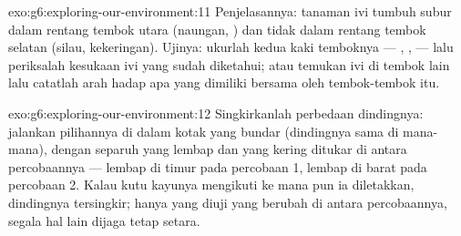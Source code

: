 \begin{solution}{exo:g6:exploring-our-environment:11}
Penjelasannya: tanaman ivi tumbuh subur dalam rentang  tembok
utara (naungan, ) dan tidak dalam rentang tembok selatan
(silau, kekeringan). Ujinya: ukurlah kedua kaki temboknya --- ,
,  --- lalu periksalah kesukaan ivi yang sudah
diketahui; atau temukan ivi di tembok lain lalu catatlah arah hadap
apa yang dimiliki bersama oleh tembok-tembok itu.
\end{solution}

\begin{solution}{exo:g6:exploring-our-environment:12}
Singkirkanlah perbedaan dindingnya: jalankan pilihannya di dalam kotak
yang bundar (dindingnya sama di mana-mana), dengan separuh yang lembap
dan yang kering ditukar di antara percobaannya --- lembap di timur
pada percobaan 1, lembap di barat pada percobaan 2. Kalau kutu kayunya
mengikuti  ke mana pun ia diletakkan, dindingnya
tersingkir; hanya  yang diuji yang berubah di antara
percobaannya, segala hal lain dijaga tetap setara.
\end{solution}


